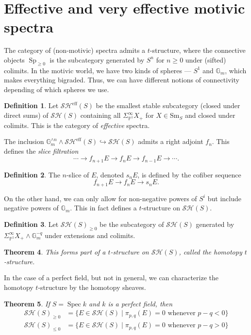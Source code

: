\documentclass{shortart}
\newtheorem{thm}{Theorem}[section]
\theoremstyle{definition}
\newtheorem{defi}[thm]{Definition}
\newcommand\Sm{\mathrm{Sm}}
\newcommand\SH{\mathcal{SH}}
\renewcommand\P{\mathbb{P}}
\newcommand\G{\mathbb{G}}
\newcommand\eff{\mathrm{eff}}
\DeclareMathOperator\Sp{Sp}
\DeclareMathOperator\Spec{Spec}
\begin{document}
\section{Effective and very effective motivic spectra}\label{chapter:effective}
The category of (non-motivic) spectra admits a $t$-structure, where the connective objects $\Sp_{\geq 0}$ is the subcategory generated by $S^n$ for $n \geq 0$ under (sifted) colimits. In the motivic world, we have two kinds of spheres --- $S^1$ and $\G_m$, which makes everything bigraded. Thus, we can have different notions of connectivity depending of which spheres we use.

\begin{defi}
  Let $\SH^{\eff}(S)$ be the smallest stable subcategory (closed under direct sums) of $\SH(S)$ containing all $\Sigma^\infty_{\P^1} X_+$ for $X \in \Sm_S$ and closed under colimits. This is the category of \emph{effective} spectra.
\end{defi}

The inclusion $\G_m^{\wedge n} \wedge \SH^{\eff}(S) \hookrightarrow \SH(S)$ admits a right adjoint $f_n$. This defines the \emph{slice filtration}
\[
  \cdots \to f_{n + 1} E \to f_n E \to f_{n - 1} E \to \cdots.
\]

\begin{defi}
  The $n$-slice of $E$, denoted $s_n E$, is defined by the cofiber sequence
  \[
    f_{n + 1} E \to f_n E \to s_n E.
  \]
\end{defi}

On the other hand, we can only allow for non-negative powers of $S^i$ but include negative powers of $\G_m$. This in fact defines a $t$-structure on $\SH(S)$.

\begin{defi}
  Let $\SH(S)_{\geq 0}$ be the subcategory of $\SH(S)$ generated by $\Sigma^\infty_{\P^1} X_+ \wedge \G_m^{-q}$ under extensions and colimits.
\end{defi}

\begin{thm}
  This forms part of a $t$-structure on $\SH(S)$, called the \emph{homotopy $t$-structure}.
\end{thm}

In the case of a perfect field, but not in general, we can characterize the homotopy $t$-structure by the homotopy sheaves.
\begin{thm}
  If $S = \Spec k$ and $k$ is a perfect field, then
  \[
    \begin{aligned}
      \SH(S)_{\geq 0} &= \{ E \in \SH(S) \mid \pi_{p, q}(E) = 0\text{ whenever }p - q < 0\}\\
      \SH(S)_{\leq 0} &= \{ E \in \SH(S) \mid \pi_{p, q}(E) = 0\text{ whenever }p - q> 0\}
    \end{aligned}
  \]
\end{thm}
\end{document}
